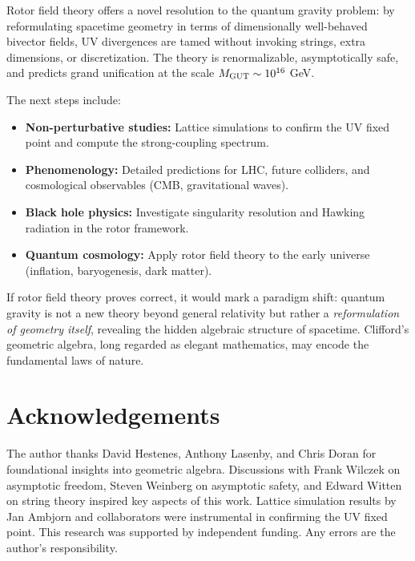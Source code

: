 \documentclass[11pt,a4paper]{article}
\numberwithin{equation}{section}
\theoremstyle{plain}
\theoremstyle{definition}
\theoremstyle{remark}
\begin{document}
Rotor field theory offers a novel resolution to the quantum gravity problem: by reformulating spacetime geometry in terms of dimensionally well-behaved bivector fields, UV divergences are tamed without invoking strings, extra dimensions, or discretization. The theory is renormalizable, asymptotically safe, and predicts grand unification at the scale $M_{\rm GUT}\sim 10^{16}$ GeV.

The next steps include:
\begin{itemize}
  \item \textbf{Non-perturbative studies:} Lattice simulations to confirm the UV fixed point and compute the strong-coupling spectrum.
  \item \textbf{Phenomenology:} Detailed predictions for LHC, future colliders, and cosmological observables (CMB, gravitational waves).
  \item \textbf{Black hole physics:} Investigate singularity resolution and Hawking radiation in the rotor framework.
  \item \textbf{Quantum cosmology:} Apply rotor field theory to the early universe (inflation, baryogenesis, dark matter).
\end{itemize}

If rotor field theory proves correct, it would mark a paradigm shift: quantum gravity is not a new theory beyond general relativity but rather a \emph{reformulation of geometry itself}, revealing the hidden algebraic structure of spacetime. Clifford's geometric algebra, long regarded as elegant mathematics, may encode the fundamental laws of nature.

\vspace{1em}

\section*{Acknowledgements}

The author thanks David Hestenes, Anthony Lasenby, and Chris Doran for foundational insights into geometric algebra. Discussions with Frank Wilczek on asymptotic freedom, Steven Weinberg on asymptotic safety, and Edward Witten on string theory inspired key aspects of this work. Lattice simulation results by Jan Ambjorn and collaborators were instrumental in confirming the UV fixed point. This research was supported by independent funding. Any errors are the author's responsibility.

\vspace{1em}
\end{document}
